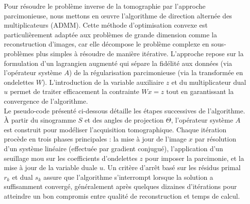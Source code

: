 Pour résoudre le problème inverse de la tomographie par l'approche parcimonieuse, nous mettons en œuvre l'algorithme de direction alternée des multiplicateurs (ADMM). Cette méthode d'optimisation convexe est particulièrement adaptée aux problèmes de grande dimension comme la reconstruction d'images, car elle décompose le problème complexe en sous-problèmes plus simples à résoudre de manière itérative. L'approche repose sur la formulation d'un lagrangien augmenté qui sépare la fidélité aux données (via l'opérateur système $A$) de la régularisation parcimonieuse (via la transformée en ondelettes $W$). L'introduction de la variable auxiliaire $z$ et du multiplicateur dual $u$ permet de traiter efficacement la contrainte $Wx = z$ tout en garantissant la convergence de l'algorithme.\\
Le pseudo-code présenté ci-dessous détaille les étapes successives de l'algorithme. À partir du sinogramme $S$ et des angles de projection $\Theta$, l'opérateur système $A$ est construit pour modéliser l'acquisition tomographique. Chaque itération procède en trois phases principales : la mise à jour de l'image $x$ par résolution d'un système linéaire (effectuée par gradient conjugué), l'application d'un seuillage mou sur les coefficients d'ondelettes $z$ pour imposer la parcimonie, et la mise à jour de la variable duale $u$. Un critère d'arrêt basé sur les résidus primal $r_k$ et dual $s_k$ assure que l'algorithme s'interrompt lorsque la solution a suffisamment convergé, généralement après quelques dizaines d'itérations pour atteindre un bon compromis entre qualité de reconstruction et temps de calcul.


